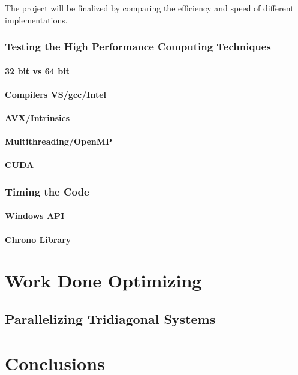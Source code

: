 \documentclass[12pt, oneside]{book}
\theoremstyle{plain}
\theoremstyle{definition}
\begin{document}
The project will be finalized by comparing the efficiency and speed of different implementations.


\subsection{Testing the High Performance Computing Techniques}
\subsubsection{32 bit vs 64 bit}
\lipsum[5]
\subsubsection{Compilers VS/gcc/Intel}
\lipsum[5]
\subsubsection{AVX/Intrinsics}
\lipsum[5]
\subsubsection{Multithreading/OpenMP}
\lipsum[5]	
\subsubsection{CUDA}
\lipsum[5]	
\subsection{Timing the Code}
\subsubsection{Windows API}
\lipsum[5]
\subsubsection{Chrono Library}
\lipsum[5]

\chapter{Work Done Optimizing}

\section{Parallelizing Tridiagonal Systems}


\chapter{Conclusions}
\end{document}
